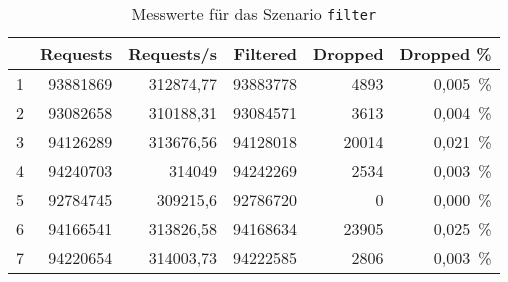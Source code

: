 \begin{table}[H]
  \centering
  \bgroup
  \def\arraystretch{1.2}
  \begin{tabular}{crrrrr}
      & \textbf{Requests} & \textbf{Requests/s} & \textbf{Filtered} & \textbf{Dropped} & \textbf{Dropped \%} \\\hline\hline
      1 & 93881869 & 312874,77 & 93883778 & 4893 & 0,005~\%\\\hline
      2 & 93082658 & 310188,31 & 93084571 & 3613 & 0,004~\%\\\hline
      3 & 94126289 & 313676,56 & 94128018 & 20014 & 0,021~\%\\\hline
      4 & 94240703 & 314049 & 94242269 & 2534 & 0,003~\%\\\hline
      5 & 92784745 & 309215,6 & 92786720 & 0 & 0,000~\%\\\hline
      6 & 94166541 & 313826,58 & 94168634 & 23905 & 0,025~\%\\\hline
      7 & 94220654 & 314003,73 & 94222585 & 2806 & 0,003~\%\\\hline
  \end{tabular}
  \egroup
  \caption{Messwerte für das Szenario \texttt{filter}}\label{tab:messwerte-filter}
\end{table}

